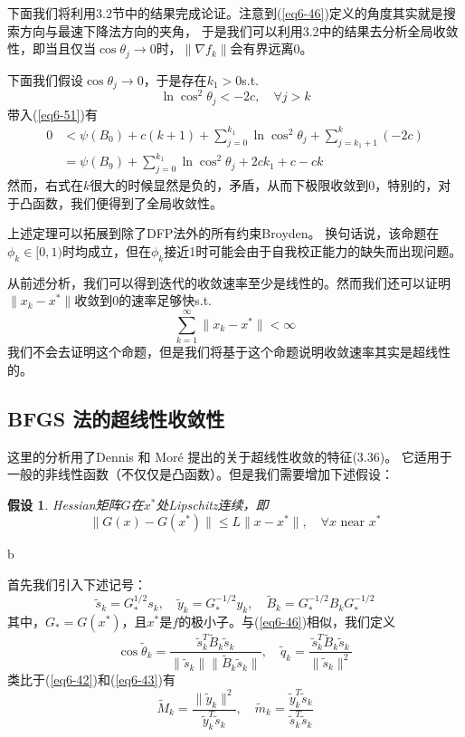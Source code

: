 \documentclass{article}
\newtheorem{asp}{假设}
\begin{document}
下面我们将利用3.2节中的结果完成论证。注意到(\ref{eq6-46})定义的角度其实就是搜索方向与最速下降法方向的夹角，
于是我们可以利用3.2中的结果去分析全局收敛性，即当且仅当$\cos\theta_j \rightarrow 0$时，$\|\nabla f_k\|$会有界远离0。

下面我们假设$\cos\theta_j \rightarrow 0$，于是存在$k_1>0$s.t.
\[
  \ln \cos^2 \theta_j < -2c,\quad \forall j>k
\]
带入(\ref{eq6-51})有
\[\begin{split}
0 & < \psi(B_0) + c(k+1) + \sum_{j=0}^{k_1}\ln \cos^2\theta_j + \sum_{j=k_1+1}^{k}(-2c)\\
& = \psi(B_9) + \sum_{j=0}^{k_1}\ln \cos^2 \theta_j + 2ck_1 + c - ck
\end{split}
\]
然而，右式在$k$很大的时候显然是负的，矛盾，从而下极限收敛到0，特别的，对于凸函数，我们便得到了全局收敛性。

上述定理可以拓展到除了DFP法外的所有约束Broyden。
换句话说，该命题在$\phi_k\in[0,1)$时均成立，但在$\phi_k$接近1时可能会由于自我校正能力的缺失而出现问题。

从前述分析，我们可以得到迭代的收敛速率至少是线性的。然而我们还可以证明$\|x_k-x^*\|$收敛到0的速率足够快s.t.
\begin{equation}
  \label{eq6-52}
  \sum_{k=1}^{\infty}\|x_k - x^*\| < \infty
\end{equation}
我们不会去证明这个命题，但是我们将基于这个命题说明收敛速率其实是超线性的。

\subsection{BFGS 法的超线性收敛性}
这里的分析用了Dennis 和 Mor\'{e} 提出的关于超线性收敛的特征(3.36)。
它适用于一般的非线性函数（不仅仅是凸函数）。但是我们需要增加下述假设：
\begin{asp}
  \label{asp6-2}
  Hessian矩阵$G$在$x^*$处Lipschitz连续，即
  \[
    \|G(x) - G(x^*)\| \le L\|x-x^*\|,\quad \forall x\text{ near }x^*
  \]
\end{asp}b

首先我们引入下述记号：
\[
  \tilde{s}_k = G^{1/2}_*s_k,\quad \tilde{y}_k = G^{-1/2}_*y_k,
  \quad \tilde{B}_k = G_*^{-1/2}B_kG_*^{-1/2}
\]
其中，$G_* = G(x^*)$，且$x^*$是$f$的极小子。与(\ref{eq6-46})相似，我们定义
\[
  \cos \tilde{\theta}_k = \frac{\tilde{s}_k^T\tilde{B}_k\tilde{s}_k}{\|\tilde{s}_k\|\|\tilde{B}_k\tilde{s}_k\|},
  \quad \tilde{q}_k = \frac{\tilde{s}_k^T\tilde{B}_k\tilde{s}_k}{\|\tilde{s}_k\|^2}
\]
类比于(\ref{eq6-42})和(\ref{eq6-43})有
\[
  \tilde{M}_k = \frac{\|\tilde{y}_k\|^2}{\tilde{y}_k^T\tilde{s}_k},
  \quad \tilde{m}_k = \frac{\tilde{y}_k^T\tilde{s}_k}{\tilde{s}_k^T \tilde{s}_k}
\]
\end{document}
